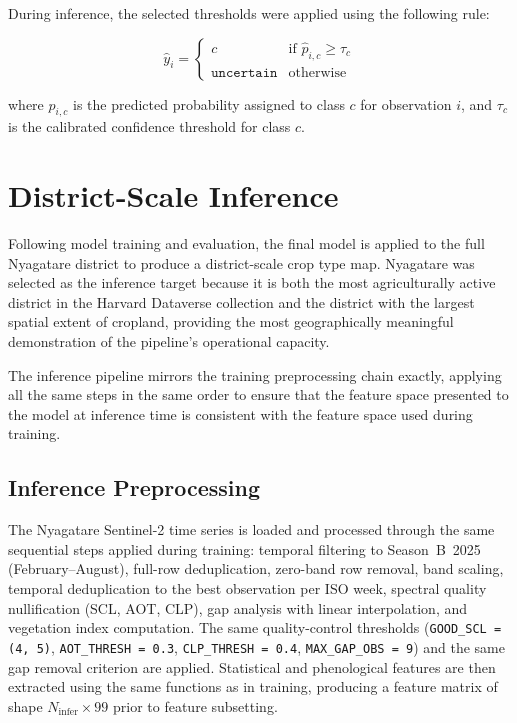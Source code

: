 During inference, the selected thresholds were applied using the following
rule:

\begin{equation}
\hat{y}_i =
\begin{cases}
c & \text{if } \hat{p}_{i,c} \geq \tau_c \\
\texttt{uncertain} & \text{otherwise}
\end{cases}
\end{equation}

where $\hat{p}_{i,c}$ is the predicted probability assigned to class
$c$ for observation $i$, and $\tau_c$ is the calibrated confidence
threshold for class $c$.


\section{District-Scale Inference}
\label{sec:inference}

Following model training and evaluation, the final model is applied to
the full Nyagatare district to produce a district-scale crop type map.
Nyagatare was selected as the inference target because it is both the
most agriculturally active district in the Harvard Dataverse collection
and the district with the largest spatial extent of cropland, providing
the most geographically meaningful demonstration of the pipeline's
operational capacity.

The inference pipeline mirrors the training preprocessing chain exactly,
applying all the same steps in the same order to ensure that the feature
space presented to the model at inference time is consistent with the
feature space used during training.


\subsection{Inference Preprocessing}
\label{subsec:inference_preprocessing}

The Nyagatare Sentinel-2 time series is loaded and processed through the
same sequential steps applied during training: temporal filtering to
Season~B~2025 (February--August), full-row deduplication, zero-band row
removal, band scaling, temporal deduplication to the best observation per
ISO week, spectral quality nullification (SCL, AOT, CLP), gap analysis
with linear interpolation, and vegetation index computation. The same
quality-control thresholds (\texttt{GOOD\_SCL = (4, 5)},
\texttt{AOT\_THRESH = 0.3}, \texttt{CLP\_THRESH = 0.4},
\texttt{MAX\_GAP\_OBS = 9}) and the same gap removal criterion are applied.
Statistical and phenological features are then extracted using the same
functions as in training, producing a feature matrix of shape
$N_{\mathrm{infer}} \times 99$ prior to feature subsetting.


